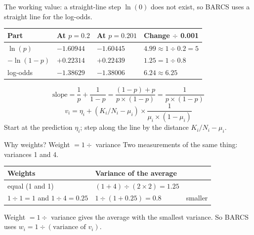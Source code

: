 \documentclass[aspectratio=169,11pt]{beamer}
\begin{document}
\begin{frame}{The working value: a straight-line step}
$\ln(0)$ does not exist, so BARCS uses a straight line for the log-odds.
\medskip

\small
\begin{tabular}{@{}l l l l@{}}
\toprule
Part & At $p = 0.2$ & At $p = 0.201$ & Change $\div$ 0.001\\
\midrule
$\ln(p)$ & $-1.60944$ & $-1.60445$ & $4.99 \approx 1 \div 0.2 = 5$\\
$-\ln(1-p)$ & $+0.22314$ & $+0.22439$ & $1.25 = 1 \div 0.8$\\
log-odds & $-1.38629$ & $-1.38006$ & $6.24 \approx 6.25$\\
\bottomrule
\end{tabular}
\normalsize
\[
\text{slope} = \frac{1}{p} + \frac{1}{1-p} = \frac{(1-p) + p}{p \times (1-p)}
 = \frac{1}{p \times (1-p)}
\]
\vspace{-0.4em}
\[
v_i = \eta_i + (K_i/N_i - \mu_i) \times \frac{1}{\mu_i \times (1-\mu_i)}
\]
{\small Start at the prediction $\eta_i$; step along the line by the distance
$K_i/N_i - \mu_i$.}
\end{frame}

\begin{frame}{Why weights? Weight $= 1 \div$ variance}
Two measurements of the same thing: variances 1 and 4.
\medskip

\begin{tabular}{@{}lll@{}}
\toprule
Weights & Variance of the average & \\
\midrule
equal (1 and 1) & $(1 + 4) \div (2 \times 2) = 1.25$ & \\
$1 \div 1 = 1$ and $1 \div 4 = 0.25$ & $1 \div (1 + 0.25) = 0.8$ & \alert{smaller}\\
\bottomrule
\end{tabular}
\medskip

\begin{remember}
Weight $= 1 \div$ variance gives the average with the smallest variance.
So BARCS uses $w_i = 1 \div (\text{variance of } v_i)$.
\end{remember}
\end{frame}
\end{document}

